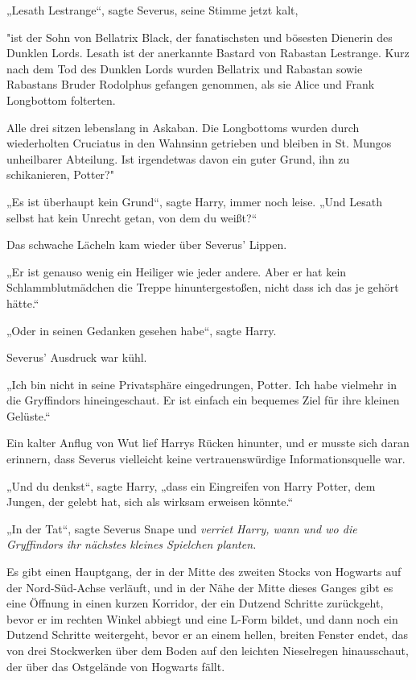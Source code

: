 {„Lesath Lestrange“, sagte Severus, seine Stimme jetzt kalt,

"ist der Sohn von Bellatrix Black, der fanatischsten und bösesten Dienerin des Dunklen Lords. Lesath ist der anerkannte Bastard von Rabastan Lestrange. Kurz nach dem Tod des Dunklen Lords wurden Bellatrix und Rabastan sowie Rabastans Bruder Rodolphus gefangen genommen, als sie Alice und Frank Longbottom folterten.

Alle drei sitzen lebenslang in Askaban. Die Longbottoms wurden durch wiederholten Cruciatus in den Wahnsinn getrieben und bleiben in St. Mungos unheilbarer Abteilung. Ist irgendetwas davon ein guter Grund, ihn zu schikanieren, Potter?"

„Es ist überhaupt kein Grund“, sagte Harry, immer noch leise. „Und Lesath selbst hat kein Unrecht getan, von dem du weißt?“

Das schwache Lächeln kam wieder über Severus' Lippen.

„Er ist genauso wenig ein Heiliger wie jeder andere. Aber er hat kein Schlammblutmädchen die Treppe hinuntergestoßen, nicht dass ich das je gehört hätte.“

„Oder in seinen Gedanken gesehen habe“, sagte Harry.

Severus' Ausdruck war kühl.

„Ich bin nicht in seine Privatsphäre eingedrungen, Potter. Ich habe vielmehr in die Gryffindors hineingeschaut. Er ist einfach ein bequemes Ziel für ihre kleinen Gelüste.“

Ein kalter Anflug von Wut lief Harrys Rücken hinunter, und er musste sich daran erinnern, dass Severus vielleicht keine vertrauenswürdige Informationsquelle war.

„Und du denkst“, sagte Harry, „dass ein Eingreifen von Harry Potter, dem Jungen, der gelebt hat, sich als wirksam erweisen könnte.“

„In der Tat“, sagte Severus Snape und \emph{verriet Harry, wann und wo die Gryffindors ihr nächstes kleines Spielchen planten.}

Es gibt einen Hauptgang, der in der Mitte des zweiten Stocks von Hogwarts auf der Nord-Süd-Achse verläuft, und in der Nähe der Mitte dieses Ganges gibt es eine Öffnung in einen kurzen Korridor, der ein Dutzend Schritte zurückgeht, bevor er im rechten Winkel abbiegt und eine L-Form bildet, und dann noch ein Dutzend Schritte weitergeht, bevor er an einem hellen, breiten Fenster endet, das von drei Stockwerken über dem Boden auf den leichten Nieselregen hinausschaut, der über das Ostgelände von Hogwarts fällt.

}
